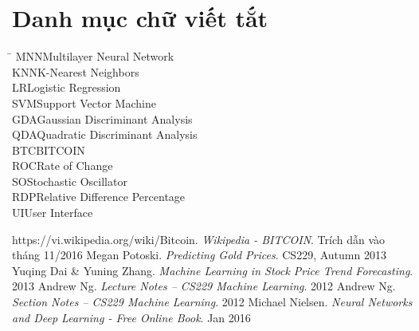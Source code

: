 \documentclass[12pt,a4paper]{report}
\begin{document}
 



\tableofcontents
\pagebreak
\listoffigures
\pagebreak 
\listoftables  
\pagebreak

\chapter*{Danh mục chữ viết tắt}
\thispagestyle{plain} 
\begin{tabbing}
\hspace{3cm}\= \kill
MNN\>Multilayer Neural Network\\
KNN\>K-Nearest Neighbors\\
LR\>Logistic Regression\\
SVM\>Support Vector Machine\\
GDA\>Gaussian Discriminant Analysis\\
QDA\>Quadratic Discriminant Analysis\\
BTC\>BITCOIN\\
ROC\>Rate of Change\\
SO\>Stochastic Oscillator\\
RDP\>Relative Difference Percentage\\
UI\>User Interface\\

\end{tabbing}

\pagebreak 


 




 
\pagebreak
\begin{thebibliography}{9}

https://vi.wikipedia.org/wiki/Bitcoin. \emph{Wikipedia - BITCOIN}. Trích dẫn vào
tháng 11/2016
Megan Potoski. \emph{Predicting Gold Prices}. CS229, Autumn 2013
Yuqing Dai \& Yuning Zhang. \emph{Machine Learning in Stock Price Trend Forecasting}. 2013 
Andrew Ng. \emph{Lecture Notes – CS229 Machine Learning}. 2012
Andrew Ng. \emph{Section Notes – CS229 Machine Learning}. 2012
Michael Nielsen. \emph{Neural Networks and Deep Learning - Free Online Book}. Jan 2016
\end{thebibliography}
\end{document}
